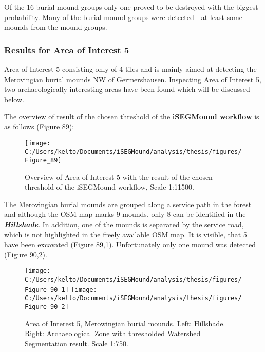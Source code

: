 \documentclass[
  12pt,
]{article}
\begin{document}
Of the 16 burial mound groups only one proved to be destroyed with the biggest probability. Many of the burial mound groups were detected - at least some mounds from the mound groups.

\hypertarget{results-for-area-of-interest-5}{%
\subsubsection{\texorpdfstring{\textbf{Results for Area of Interest 5}}{Results for Area of Interest 5}}\label{results-for-area-of-interest-5}}

Area of Interest 5 consisting only of 4 tiles and is mainly aimed at detecting the Merovingian burial mounds NW of Germershausen. Inspecting Area of Interest 5, two archaeologically interesting areas have been found which will be discussed below.

The overview of result of the chosen threshold of the \textbf{iSEGMound workflow} is as follows (Figure 89):

\begin{figure}

{\centering \texttt{[image: C:/Users/kelto/Documents/iSEGMound/analysis/thesis/figures/Figure\_89]} 

}

\caption{Overview of Area of Interest 5 with the result of the chosen threshold of the iSEGMound workflow, Scale 1:11500.}\label{fig:Figure89}
\end{figure}

The Merovingian burial mounds are grouped along a service path in the forest and although the OSM map marks 9 mounds, only 8 can be identified in the \textbf{\emph{Hillshade}}. In addition, one of the mounds is separated by the service road, which is not highlighted in the freely available OSM map. It is visible, that 5 have been excavated (Figure 89,1). Unfortunately only one mound was detected (Figure 90,2).

\begin{figure}
\texttt{[image: C:/Users/kelto/Documents/iSEGMound/analysis/thesis/figures/Figure\_90\_1]} \texttt{[image: C:/Users/kelto/Documents/iSEGMound/analysis/thesis/figures/Figure\_90\_2]} \caption{Area of Interest 5, Merowingian burial mounds. Left: Hillshade. Right: Archaeological Zone with thresholded Watershed Segmentation result. Scale 1:750.}\label{fig:Figure90}
\end{figure}
\end{document}
